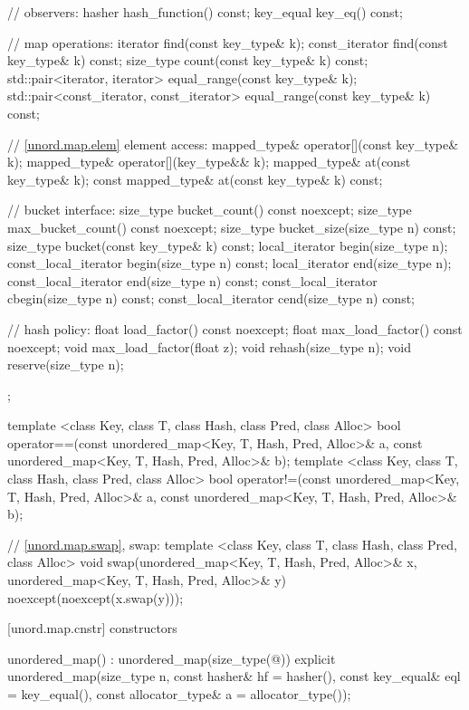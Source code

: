 \begin{codeblock}
{{    // observers:
    hasher hash_function() const;
    key_equal key_eq() const;

    // map operations:
    iterator       find(const key_type& k);
    const_iterator find(const key_type& k) const;
    size_type      count(const key_type& k) const;
    std::pair<iterator, iterator>             equal_range(const key_type& k);
    std::pair<const_iterator, const_iterator> equal_range(const key_type& k) const;

    // \ref{unord.map.elem} element access:
    mapped_type& operator[](const key_type& k);
    mapped_type& operator[](key_type&& k);
    mapped_type& at(const key_type& k);
    const mapped_type& at(const key_type& k) const;

    // bucket interface:
    size_type bucket_count() const noexcept;
    size_type max_bucket_count() const noexcept;
    size_type bucket_size(size_type n) const;
    size_type bucket(const key_type& k) const;
    local_iterator begin(size_type n);
    const_local_iterator begin(size_type n) const;
    local_iterator end(size_type n);
    const_local_iterator end(size_type n) const;
    const_local_iterator cbegin(size_type n) const;
    const_local_iterator cend(size_type n) const;

    // hash policy:
    float load_factor() const noexcept;
    float max_load_factor() const noexcept;
    void max_load_factor(float z);
    void rehash(size_type n);
    void reserve(size_type n);
  };

  template <class Key, class T, class Hash, class Pred, class Alloc>
    bool operator==(const unordered_map<Key, T, Hash, Pred, Alloc>& a,
                    const unordered_map<Key, T, Hash, Pred, Alloc>& b);
  template <class Key, class T, class Hash, class Pred, class Alloc>
    bool operator!=(const unordered_map<Key, T, Hash, Pred, Alloc>& a,
                    const unordered_map<Key, T, Hash, Pred, Alloc>& b);

  // \ref{unord.map.swap}, swap:
  template <class Key, class T, class Hash, class Pred, class Alloc>
    void swap(unordered_map<Key, T, Hash, Pred, Alloc>& x,
              unordered_map<Key, T, Hash, Pred, Alloc>& y)
      noexcept(noexcept(x.swap(y)));
}
\end{codeblock}

[unord.map.cnstr]{ constructors}

%
\begin{itemdecl}
unordered_map() : unordered_map(size_type(@\seebelow@)) { }
explicit unordered_map(size_type n,
                       const hasher& hf = hasher(),
                       const key_equal& eql = key_equal(),
                       const allocator_type& a = allocator_type());
\end{itemdecl}

